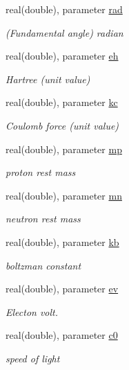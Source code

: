 \begin{DoxyCompactItemize}
real(double), parameter \hyperlink{namespaceatomicunits_a07ac069b1a5417fd61aa3954d6b66d83}{rad}
\begin{DoxyCompactList}\small\item\em (Fundamental angle) radian \end{DoxyCompactList}\item 
real(double), parameter \hyperlink{namespaceatomicunits_a39b85d20ed96ab0b9dfb86c7646a61a0}{eh}
\begin{DoxyCompactList}\small\item\em Hartree (unit value) \end{DoxyCompactList}\item 
real(double), parameter \hyperlink{namespaceatomicunits_aafc175708d34f52459448530cdec9aae}{kc}
\begin{DoxyCompactList}\small\item\em Coulomb force (unit value) \end{DoxyCompactList}\item 
real(double), parameter \hyperlink{namespaceatomicunits_a62f37608529c74a442a81baa515965d6}{mp}
\begin{DoxyCompactList}\small\item\em proton rest mass \end{DoxyCompactList}\item 
real(double), parameter \hyperlink{namespaceatomicunits_a001e0a01ab152644eb7df31ade44b290}{mn}
\begin{DoxyCompactList}\small\item\em neutron rest mass \end{DoxyCompactList}\item 
real(double), parameter \hyperlink{namespaceatomicunits_afe876defe82137d91908691c6765a5f1}{kb}
\begin{DoxyCompactList}\small\item\em boltzman constant \end{DoxyCompactList}\item 
real(double), parameter \hyperlink{namespaceatomicunits_a10a69964ce0d082d71ee5ae34a5a0d24}{ev}
\begin{DoxyCompactList}\small\item\em Electon volt. \end{DoxyCompactList}\item 
real(double), parameter \hyperlink{namespaceatomicunits_ae35b35bfa15b571da842371a32dcb2e6}{c0}
\begin{DoxyCompactList}\small\item\em speed of light \end{DoxyCompactList}\item 

\end{DoxyCompactItemize}
